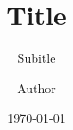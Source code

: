 \documentclass[utf8]{ctexbeamer}
\title{Title}
\subtitle{Subitle}
\author{Author}
\institute{Institution}
\date{{\today}}
\begin{document}
\begin{frame}
  \titlepage
\end{frame}
\end{document}
